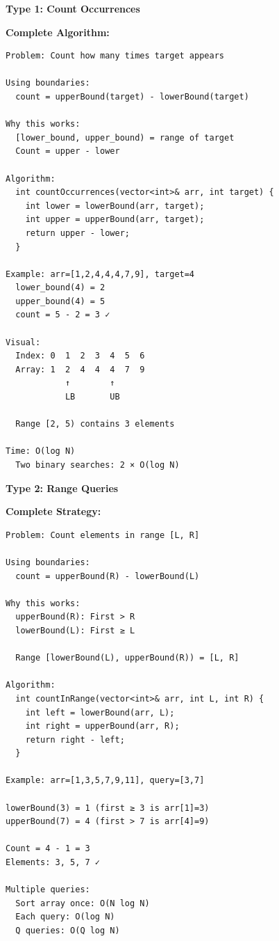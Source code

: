 \documentclass[11pt,a4paper,oneside]{book}
\begin{document}
\begin{tcolorbox}[
    enhanced,breakable,
    colback=lightgray,
    colframe=accentorange,
    boxrule=2pt,
    arc=4mm,
    title=\textbf{Complete Counting Patterns}
]
\textbf{Type 1: Count Occurrences}

\textbf{Complete Algorithm:}
\begin{verbatim}
Problem: Count how many times target appears

Using boundaries:
  count = upperBound(target) - lowerBound(target)

Why this works:
  [lower_bound, upper_bound) = range of target
  Count = upper - lower

Algorithm:
  int countOccurrences(vector<int>& arr, int target) {
    int lower = lowerBound(arr, target);
    int upper = upperBound(arr, target);
    return upper - lower;
  }

Example: arr=[1,2,4,4,4,7,9], target=4
  lower_bound(4) = 2
  upper_bound(4) = 5
  count = 5 - 2 = 3 ✓

Visual:
  Index: 0  1  2  3  4  5  6
  Array: 1  2  4  4  4  7  9
            ↑        ↑
            LB       UB
         
  Range [2, 5) contains 3 elements

Time: O(log N)
  Two binary searches: 2 × O(log N)
\end{verbatim}

\textbf{Type 2: Range Queries}

\textbf{Complete Strategy:}
\begin{verbatim}
Problem: Count elements in range [L, R]

Using boundaries:
  count = upperBound(R) - lowerBound(L)

Why this works:
  upperBound(R): First > R
  lowerBound(L): First ≥ L
  
  Range [lowerBound(L), upperBound(R)) = [L, R]

Algorithm:
  int countInRange(vector<int>& arr, int L, int R) {
    int left = lowerBound(arr, L);
    int right = upperBound(arr, R);
    return right - left;
  }

Example: arr=[1,3,5,7,9,11], query=[3,7]

lowerBound(3) = 1 (first ≥ 3 is arr[1]=3)
upperBound(7) = 4 (first > 7 is arr[4]=9)

Count = 4 - 1 = 3
Elements: 3, 5, 7 ✓

Multiple queries:
  Sort array once: O(N log N)
  Each query: O(log N)
  Q queries: O(Q log N)
  

\end{verbatim}
\end{tcolorbox}
\end{document}
